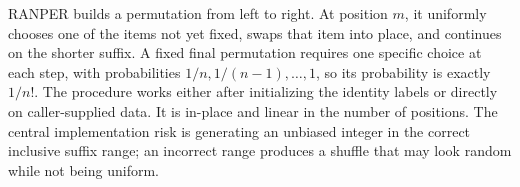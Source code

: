 \documentclass[10pt,letterpaper]{article}
\begin{document}
\begin{tcolorbox}[colback=Ink!4,colframe=Ink,title=Cornell summary]
RANPER builds a permutation from left to right. At position $m$, it uniformly chooses one of the items not yet fixed, swaps that item into place, and continues on the shorter suffix. A fixed final permutation requires one specific choice at each step, with probabilities $1/n,1/(n-1),\ldots,1$, so its probability is exactly $1/n!$. The procedure works either after initializing the identity labels or directly on caller-supplied data. It is in-place and linear in the number of positions. The central implementation risk is generating an unbiased integer in the correct inclusive suffix range; an incorrect range produces a shuffle that may look random while not being uniform.
\end{tcolorbox}
\end{document}
